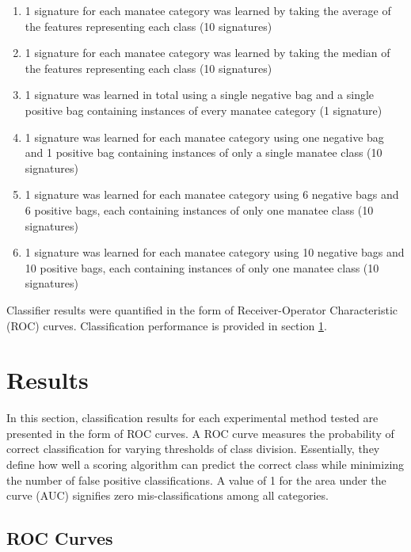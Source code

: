 \documentclass[conference]{IEEEtran}
\begin{document}
\begin{enumerate}
	\item 1 signature for each manatee category was learned by taking the average of the features representing each class (10 signatures)
	\item 1 signature for each manatee category was learned by taking the median of the features representing each class (10 signatures)
	\item 1 signature was learned in total using a single negative bag and a single positive bag containing instances of every manatee category (1 signature)
	\item 1 signature was learned for each manatee category using one negative bag and 1 positive bag containing instances of only a single manatee class (10 signatures)
	\item 1 signature was learned for each manatee category using 6 negative bags and 6 positive bags, each containing instances of only one manatee class (10 signatures)
	\item 1 signature was learned for each manatee category using 10 negative bags and 10 positive bags, each containing instances of only one manatee class (10 signatures)
\end{enumerate}
\noindent
Classifier results were quantified in the form of Receiver-Operator Characteristic (ROC) curves.  Classification performance is provided in section \ref{Results}.


\section{Results} \label{Results}

In this section, classification results for each experimental method tested are presented in the form of ROC curves.  A ROC curve measures the probability of correct classification for varying thresholds of class division.  Essentially, they define how well a scoring algorithm can predict the correct class while minimizing the number of false positive classifications.  A value of 1 for the area under the curve (AUC) signifies zero mis-classifications among all categories.  

\vspace{3cm}
\subsection{ROC Curves}
\end{document}
